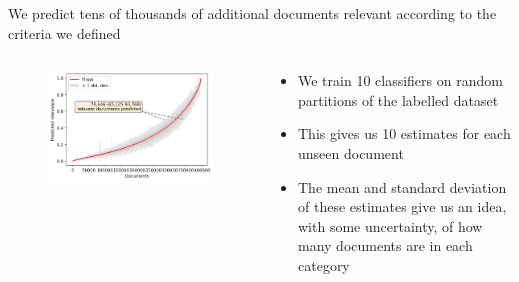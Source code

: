 \documentclass[9pt]{beamer}
\begin{document}
\begin{frame}{We predict tens of thousands of additional documents relevant according to the criteria we defined}

\begin{columns}
	\begin{column}{0.618\linewidth}
		\begin{figure}
			\includegraphics[width=\linewidth]{../plots/prediction_models/predictions_unseen.png}
		\end{figure}
	\end{column}
	\begin{column}{0.382\linewidth}
		\begin{itemize}
			\item We train 10 classifiers on random partitions of the labelled dataset
			\item This gives us 10 estimates for each unseen document
			\item The mean and standard deviation of these estimates give us an idea, with some uncertainty, of how many documents are in each category
		\end{itemize}
	\end{column}
\end{columns}

\end{frame}
\end{document}
